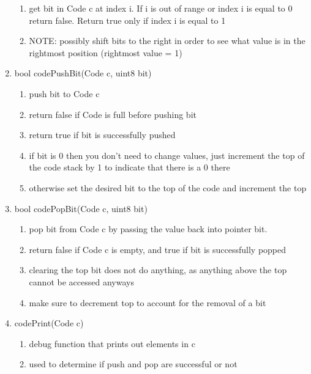 \documentclass[11pt]{article}
\begin{document}
\begin{enumerate}
	\begin{enumerate}
	\item get bit in Code c at index i. If i is out of range or index i is equal to 0 return false. Return true only if index i is equal to 1
	\item NOTE: possibly shift bits to the right in order to see what value is in the rightmost position (rightmost value = 1)
	\end{enumerate}
\item bool codePushBit(Code c, uint8 bit)
	\begin{enumerate}
	\item push bit to Code c
	\item return false if Code is full before pushing bit
	\item return true if bit is successfully pushed
	\item if bit is 0 then you don't need to change values, just increment the top of the code stack by 1 to indicate that there is a 0 there
	\item otherwise set the desired bit to the top of the code and increment the top
	\end{enumerate}
\item bool codePopBit(Code c, uint8 bit)
	\begin{enumerate}
	\item pop bit from Code c by passing the value back into pointer bit.
	\item return false if Code c is empty, and true if bit is successfully popped
	\item clearing the top bit does not do anything, as anything above the top cannot be accessed anyways
	\item make sure to decrement top to account for the removal of a bit
	\end{enumerate}
\item codePrint(Code c)
	\begin{enumerate}
	\item debug function that prints out elements in c
	\item used to determine if push and pop are successful or not
	\end{enumerate}
\end{enumerate}
\end{document}
